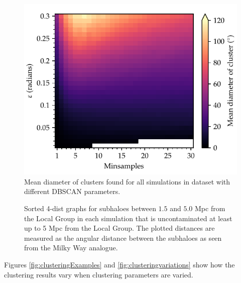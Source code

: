 \documentclass[english, oneside]{HYgradu}
\begin{document}
\begin{figure}
    \centering
    \includegraphics{kuvat/clusterDiameter.pdf}
    \caption{Mean diameter of clusters found for all simulations in dataset with different DBSCAN parameters.}\label{fig:clusterdiameter}
\end{figure}

\begin{figure}
    \centering
    
    \caption{Sorted 4-dist graphs for subhaloes between $1.5$ and $5.0$ Mpc from the Local Group in each simulation that is uncontaminated at least up to 5 Mpc from the Local Group. The plotted distances are measured as the angular distance between the subhaloes as seen from the Milky Way analogue. %
    }\label{fig:4-distances}
\end{figure}

Figures \ref{fig:clusteringExamples} and \ref{fig:clusteringvariations} show how the clustering results vary when clustering parameters are varied.
\end{document}
